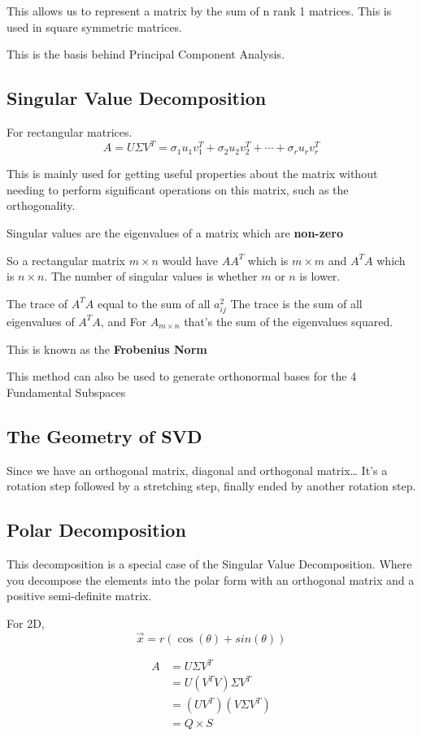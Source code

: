 \documentclass[11pt]{article}
\begin{document}
This allows us to represent a matrix by the sum of n rank 1 matrices.
This is used in square symmetric matrices.

This is the basis behind Principal Component Analysis.
\subsection{Singular Value Decomposition}
\label{singular-value-decomposition}
For rectangular matrices.
\[A = U \Sigma V^T  = \sigma_1 u_1 v_1^T + \sigma_2u_2v_2^T + \cdots + \sigma_r u_r v_r^T\]

This is mainly used for getting useful properties about the matrix
without needing to perform significant operations on this matrix, such
as the orthogonality.

Singular values are the eigenvalues of a matrix which are \textbf{non-zero}

So a rectangular matrix \(m \times n\) would have \(AA^T\) which is
\(m \times m\) and \(A^TA\) which is \(n \times n\). The number of
singular values is whether \(m\) or \(n\) is lower.

The trace of \(A^TA\) equal to the sum of all \(a_{ij}^2\) The trace is
the sum of all eigenvalues of \(A^T A\), and For \(A_{m \times n}\)
that's the sum of the eigenvalues squared.

This is known as the \textbf{Frobenius Norm}

This method can also be used to generate orthonormal bases for the 4
Fundamental Subspaces
\subsection{The Geometry of SVD}
\label{the-geometry-of-svd}
Since we have an orthogonal matrix, diagonal and orthogonal matrix\ldots{}
It's a rotation step followed by a stretching step, finally ended by
another rotation step.
\subsection{Polar Decomposition}
\label{polar-decomposition}
This decomposition is a special case of the Singular Value
Decomposition. Where you decompose the elements into the polar form with
an orthogonal matrix and a positive semi-definite matrix.

For 2D, \[\vec{x} = r(\cos(\theta) + sin(\theta))\]

\[\begin{aligned}
		A & = U \Sigma V^T        \\
		  & = U(V^TV) \Sigma V^T  \\
		  & = (UV^T)(V\Sigma V^T) \\
		  & = Q \times S          \\
	\end{aligned}\]
\end{document}
